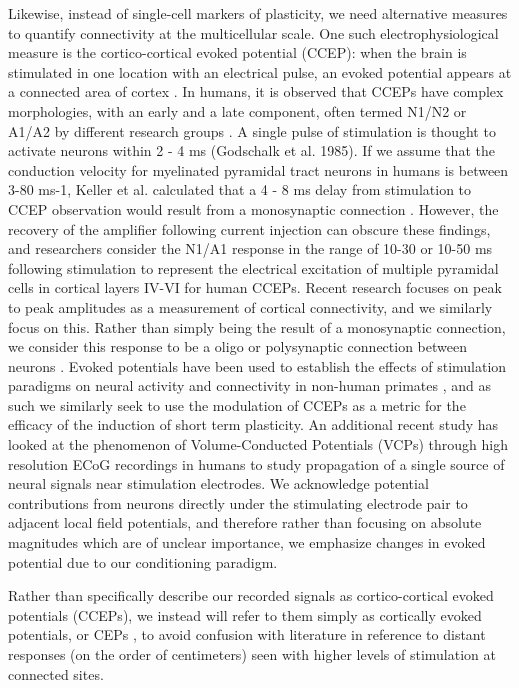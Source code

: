 Likewise, instead of single-cell markers of plasticity, we need alternative measures to quantify connectivity at the multicellular scale. One such electrophysiological measure is the cortico-cortical evoked potential (CCEP): when the brain is stimulated in one location with an electrical pulse, an evoked potential appears at a connected area of cortex \cite{Matsumoto2012,Matsumoto2006a}. In humans, it is observed that CCEPs have complex morphologies, with an early and a late component, often termed N1/N2 or A1/A2 by different research groups \cite{Matsumoto2006a,Matsumoto2012,Keller2014e}. A single pulse of stimulation is thought to activate neurons within 2 - 4 ms (Godschalk et al. 1985). If we assume that the conduction velocity for myelinated pyramidal tract neurons in humans is between 3-80 ms-1, Keller et al. calculated that a 4 - 8 ms delay from stimulation to CCEP observation would result from a monosynaptic connection \cite{Keller2014e}. However, the recovery of the amplifier following current injection can obscure these findings, and researchers consider the N1/A1 response in the range of 10-30 or 10-50  ms \cite{Keller2014d,Entz2014b} following stimulation to represent the electrical excitation of multiple pyramidal cells in cortical layers IV-VI for human CCEPs. Recent research \cite{Keller2018} focuses on peak to peak amplitudes as a measurement of cortical connectivity, and we similarly focus on this.  Rather than simply being the result of a monosynaptic connection, we consider this response to be a oligo or polysynaptic connection between neurons \cite{Keller2014e}.  Evoked potentials have been used to establish the effects of stimulation paradigms on neural activity and connectivity in non-human primates \cite{Seeman2017}, and as such we similarly seek to use the modulation of CCEPs as a metric for the efficacy of the induction of short term plasticity. An additional recent study has looked at the phenomenon of Volume-Conducted Potentials (VCPs) through high resolution ECoG recordings in humans \cite{Shimada2017} to study propagation of a single source of neural signals near stimulation electrodes. We acknowledge potential contributions from neurons directly under the stimulating electrode pair to adjacent local field potentials, and therefore rather than focusing on absolute magnitudes which are of unclear importance, we emphasize changes in evoked potential due to our conditioning paradigm. 

Rather than specifically describe our recorded signals as cortico-cortical evoked potentials (CCEPs), we instead will refer to them simply as cortically evoked potentials, or CEPs \cite{Zanos2018}, to avoid confusion with literature in reference to distant responses (on the order of centimeters) seen with higher levels of stimulation at connected sites. 

